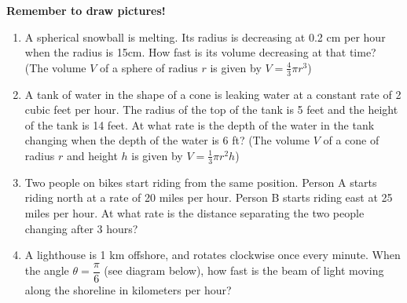 \documentclass[11pt]{article}
\begin{document}
\drawtitle

\noindent \textbf{Remember to draw pictures!}

\begin{enumerate}
\item A spherical snowball is melting. Its radius is decreasing at 0.2
  cm per hour when the radius is 15cm. How fast is its volume
  decreasing at that time? (The volume $V$ of a sphere of radius $r$
  is given by $V=\frac{4}{3}\pi r^3$)

  \newpage

\item A tank of water in the shape of a cone is leaking water at a
  constant rate of 2 cubic feet per hour. The radius of the top of the
  tank is 5 feet and the height of the tank is 14 feet. At what rate
  is the depth of the water in the tank changing when the depth of the
  water is 6 ft? (The volume $V$ of a cone of radius $r$ and height
  $h$ is given by $V=\frac{1}{3}\pi r^2 h$)

  \newpage

\item Two people on bikes start riding from the same position.  Person
  A starts riding north at a rate of 20 miles per hour. Person B starts
  riding east at 25 miles per hour.  At what rate is the distance
  separating the two people changing after 3 hours?
  

  \newpage

\item A lighthouse is 1 km offshore, and rotates clockwise once every
  minute.  When the angle $\theta=\dfrac{\pi}{6}$ (see diagram below),
  how fast is the beam of light moving along the shoreline in
  kilometers per hour?
  \begin{center}
  \end{center}

\end{enumerate}
\end{document}
